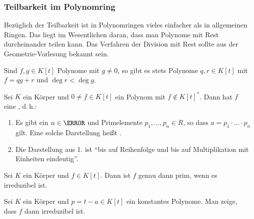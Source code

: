 \subsubsection{Teilbarkeit im Polynomring}

Bezüglich der Teilbarkeit ist in Polynomringen vieles einfacher als in allgemeinen Ringen. Das liegt im Wesentlichen daran, dass man Polynome mit Rest durcheinander teilen kann. Das Verfahren der Division mit Rest sollte aus der Geometrie-Vorlesung bekannt sein.

\begin{theorem}[Polynomdivision]\label{thm:polynomdivision}
 Sind $f, g \in K[t]$ Polynome mit $g ≠ 0$, so gibt es stets Polynome $q, r \in K[t]$ mit $f = qg + r$ und $\deg r < \deg g$.
\end{theorem}

\begin{theorem}\label{thm:ufd}
 Sei $K$ ein Körper und $0 ≠ f \in K[t]$ ein Polynom mit $f \notin K[t]^*$. Dann hat $f$ eine , d.\,h.:
 
 \begin{enumerate}
  \item Es gibt ein $n \in \N$ und Primelemente $p_1, \dots, p_n \in R$, so dass $a = p_1 \cdot \dotsc \cdot p_n$ gilt. Eine solche Darstellung heißt .
  \item Die Darstellung aus 1. ist \enquote{bis auf Reihenfolge und bis auf Multiplikation mit Einheiten eindeutig}.
 \end{enumerate}
\end{theorem}

\begin{lemma}
 Sei $K$ ein Körper und $f \in K[t]$. Dann ist $f$ genau dann prim, wenn es irreduzibel ist.
\end{lemma}

\begin{exercise}\label{ex:const->prime}
 Sei $K$ ein Körper und $p = t - a \in K[t]$ ein konstantes Polynome. Man zeige, dass $f$ dann irreduzibel ist.
\end{exercise}

